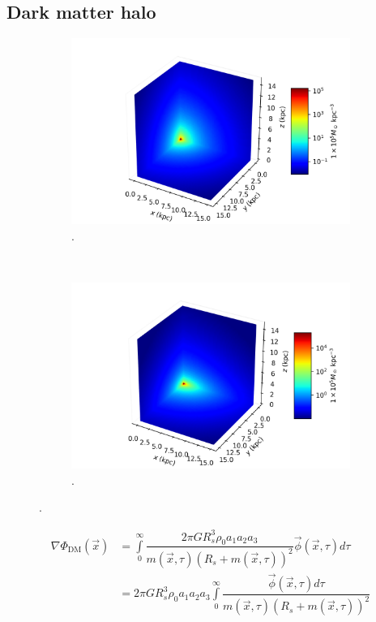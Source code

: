 	\subsection{Dark matter halo}
	\begin{figure}[h]
		\centering
		\begin{subfigure}[b]{0.49\textwidth}
			\includegraphics[width = \textwidth]{"../Files/Week 7/symmetric"}
			\caption{.}
			\label{fig: symmetricDensity3d}
		\end{subfigure}
		~ 
		\begin{subfigure}[b]{0.49\textwidth}
			\includegraphics[width=\textwidth]{"../Files/Week 7/triaxial"}
			\caption{.}
			\label{fig: triaxialDensity3d}
		\end{subfigure}
		\caption{.}
		\label{fig: symmetricTriaxial}
	\end{figure}
	\begin{equation}
		\begin{array}{rl}
			\nabla \Phi_\text{DM}(\vec{x}) & = 
			\displaystyle\int\limits_{0}^{\infty}
			\dfrac{2 \pi G R_{s}^{3}\rho_0 a_{1} a_{2} a_{3}}{m(\vec{x}, \tau)\left(R_{s} + m(\vec{x}, \tau)\right)^{2}}
			\vec{\phi}(\vec{x}, \tau) d\tau \\
			& = 2 \pi G R_{s}^{3}\rho_0 a_{1} a_{2} a_{3} \displaystyle\int\limits_{0}^{\infty}
			\dfrac{\vec{\phi}(\vec{x}, \tau) d\tau}{m(\vec{x}, \tau)\left(R_{s} + m(\vec{x}, \tau)\right)^{2}}	
		\end{array}
	\end{equation}
	
